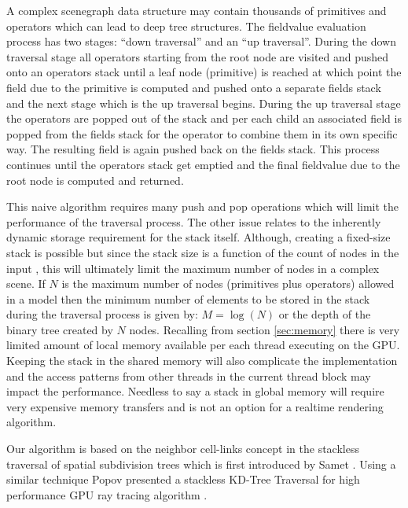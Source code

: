 A complex \blob scenegraph data structure may contain thousands of primitives and operators which can lead to deep tree structures. The fieldvalue 
evaluation process has two stages: ``down traversal'' and an ``up traversal''. During the down traversal stage all operators starting from the root node 
are visited and pushed onto an operators stack until a leaf node (primitive) is reached at which point the field due to the primitive is computed and 
pushed onto a separate fields stack and the next stage which is the up traversal begins. During the up traversal stage the operators are popped out of 
the stack and per each child an associated field is popped from the fields stack for the operator to combine them in its own specific way. The resulting 
field is again pushed back on the fields stack.  This process continues until the operators stack get emptied and the final fieldvalue due to the root node is 
computed and returned.

This naive algorithm requires many push and pop operations which will limit the performance of the traversal process. The other issue relates to the 
inherently dynamic storage requirement for the stack itself. Although, creating a fixed-size stack is possible but since the stack size is a function of
the count of nodes in the input \blob, this will ultimately limit the maximum number of nodes in a complex scene. If $N$ is the maximum number of nodes 
(primitives plus operators) allowed in a \blob model then the minimum number of elements to be stored in the stack during the traversal process 
is given by: $M=\log(N)$ or the depth of the binary tree created by $N$ nodes. Recalling from section \ref{sec:memory} there is very limited amount of
local memory available per each thread executing on the GPU. Keeping the stack in the shared memory will also complicate the implementation and
the access patterns from other threads in the current thread block may impact the performance. Needless to say a stack in global memory will require very expensive 
memory transfers and is not an option for a realtime rendering algorithm. 

Our algorithm is based on the neighbor cell-links concept in the stackless traversal of spatial subdivision trees which is first introduced by Samet \etal 
\cite{Samet1984,Samet1990}. Using a similar technique Popov \etal presented a stackless KD-Tree Traversal for high performance GPU ray tracing algorithm \cite{Popov2007}.

